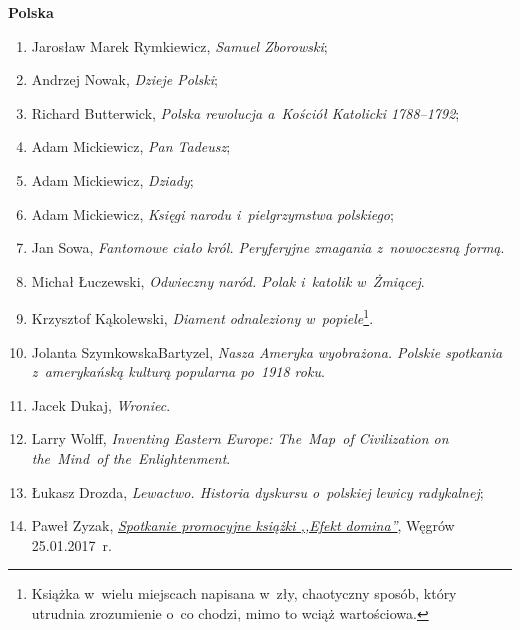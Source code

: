 \documentclass[a4paper,11pt]{article}
\newcommand{\spaceOne}{1.5em}
\newcommand{\tb}{\textbf}
\newcommand{\Field}[1]{ \begin{center} {\Large \tb{#1} } \end{center} }
\begin{document}
\vspace{\spaceOne}



\Field{Polska}



\begin{enumerate}
\item Jarosław Marek Rymkiewicz, \emph{Samuel Zborowski};
\item Andrzej Nowak, \emph{Dzieje Polski};
\item Richard Butterwick, \emph{Polska rewolucja a~Kościół Katolicki
    1788--1792};
\item Adam Mickiewicz, \emph{Pan Tadeusz};
\item Adam Mickiewicz, \emph{Dziady};
\item Adam Mickiewicz, \emph{Księgi narodu i~pielgrzymstwa polskiego};
\item Jan Sowa, \emph{Fantomowe ciało król. Peryferyjne zmagania
    z~nowoczesną formą}.
\item Michał Łuczewski, \emph{Odwieczny naród. Polak i~katolik
    w~Żmiącej}.
\item Krzysztof Kąkolewski, \emph{Diament odnaleziony
    w~popiele}\footnote{Książka w~wielu miejscach napisana w~zły,
    chaotyczny sposób, który utrudnia zrozumienie o~co chodzi, mimo to
    wciąż wartościowa.}.
\item Jolanta Szymkowska\dywiz Bartyzel, \emph{Nasza Ameryka
    wyobrażona. Polskie spotkania z~amerykańską kulturą popularna
    po~1918 roku}.
\item Jacek Dukaj, \emph{Wroniec}.
\item Larry Wolff, \emph{Inventing Eastern Europe: The~Map~of
    Civilization on the~Mind~of the~Enlightenment}.
\item Łukasz Drozda, \emph{Lewactwo. Historia dyskursu o~polskiej
    lewicy radykalnej};
\item Paweł Zyzak,
  \href{https://www.youtube.com/watch?v=_83RZpqZhwA}{\emph{Spotkanie
      promocyjne książki ,,Efekt domina''}}, Węgrów 25.01.2017~r.


\end{enumerate}
\end{document}
